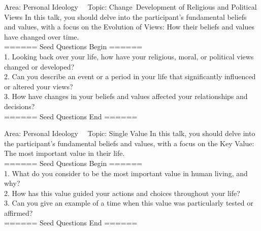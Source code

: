 \begin{mybox}{Area: Personal Ideology \ \ Topic: Change\, Development of Religious and Political Views}
In this talk, you should delve into the participant’s fundamental beliefs and values, with a focus on the Evolution of Views: How their beliefs and values have changed over time. \\
====== Seed Questions Begin ====== \\
1. Looking back over your life, how have your religious, moral, or political views changed or developed? \\
2. Can you describe an event or a period in your life that significantly influenced or altered your views? \\
3. How have changes in your beliefs and values affected your relationships and decisions? \\
====== Seed Questions End ====== \\
\end{mybox}

\begin{mybox}{Area: Personal Ideology \ \ Topic: Single Value}
In this talk, you should delve into the participant’s fundamental beliefs and values, with a focus on the Key Value: The most important value in their life. \\
====== Seed Questions Begin ====== \\
1. What do you consider to be the most important value in human living, and why? \\
2. How has this value guided your actions and choices throughout your life? \\
3. Can you give an example of a time when this value was particularly tested or affirmed? \\
====== Seed Questions End ====== \\
\end{mybox}

